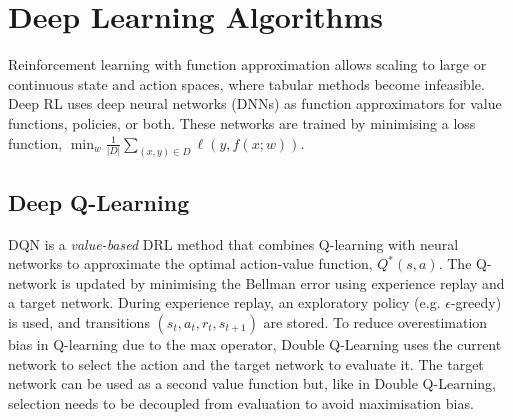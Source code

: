 \documentclass[12pt]{article}
\begin{document}
\section{Deep Learning Algorithms}

Reinforcement learning with function approximation allows scaling to large or continuous state and action spaces,
where tabular methods become infeasible.
Deep RL uses deep neural networks (DNNs) as function approximators for value functions, policies, or both.
These networks are trained by minimising a loss function, $\min_w{\frac{1}{\lvert D \rvert} \sum_{(x, y) \in D}{\ell(y, f(x; w))}}$.




\subsection{Deep Q-Learning}

DQN is a \textit{value-based} DRL method that combines Q-learning with neural networks
to approximate the optimal action-value function, $Q^*(s, a)$.
The Q-network is updated by minimising the Bellman error using experience replay and a target network.
During experience replay, an exploratory policy (e.g. $\epsilon$-greedy) is used, and transitions $(s_t, a_t, r_t, s_{t+1})$ are stored.
To reduce overestimation bias in Q-learning due to the max operator, Double Q-Learning uses the current network to select the action and the target network to evaluate it.
The target network can be used as a second value function but, like in Double Q-Learning,
selection needs to be decoupled from evaluation to avoid maximisation bias.
\end{document}
